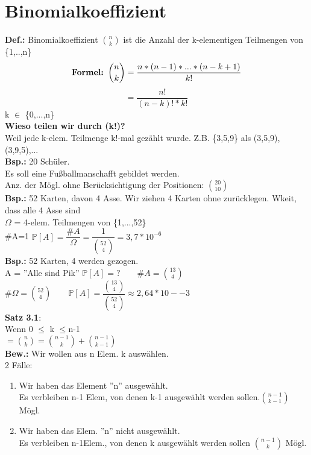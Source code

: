\section{Binomialkoeffizient}
\textbf{Def.:} Binomialkoeffizient $\binom{n}{k}$ ist die Anzahl der k-elementigen Teilmengen von \{1,..,n\}\medskip\\
 $$\text{\textbf{Formel: }}\binom{n}{k}= \frac{n*(n-1)*...*(n-k+1)}{k!}$$
 $$=\frac{n!}{(n-k)!*k!}$$ k $\in$ \{0,...,n\}\smallskip\\
\textbf{ Wieso teilen wir durch (k!)?}\\
 Weil jede k-elem. Teilmenge k!-mal gezählt wurde. Z.B. \{3,5,9\} als (3,5,9), (3,9,5),...\\
 \textbf{Bsp.:} 20 Schüler.\\Es soll eine Fußballmanschafft gebildet werden.\\
 Anz. der Mögl. ohne Berücksichtigung der Positionen: $\binom{20}{10}$\medskip\\
 \textbf{Bsp.:} 52 Karten, davon 4 Asse. Wir ziehen 4 Karten ohne zurücklegen. Wkeit, dass alle 4 Asse sind\\
 $\Omega$ = 4-elem. Teilmengen von \{1,...,52\}\\
 \#A=1 \hspace{1cm} $\mathds{P}[A]=\dfrac{\#A}{\Omega}=\dfrac{1}{\binom{52}{4}}=3,7*10^{-6}$\medskip\\
 \textbf{Bsp.:} 52 Karten, 4 werden gezogen.\\
 A = ''Alle sind Pik''
 $\mathds{P}[A]= ? \qquad \#A=\binom{13}{4} $\\
 \#$\Omega = \binom{52}{4} \qquad \mathds{P}[A] = \dfrac{\binom{13}{4}}{\binom{52}{4}} \approx 2,64*10-{-3} $\medskip\\
 \textbf{Satz 3.1}:\\ Wenn 0 $\leq$ k $\leq$n-1\\
 $=\binom{n}{k}=\binom{n-1}{k}+\binom{n-1}{k-1}$\smallskip\\
 \textbf{Bew.:} Wir wollen aus n Elem. k auswählen.\\
 2 Fälle:
 \begin{enumerate}
 	\item Wir haben das Element ''n'' ausgewählt. \\ Es verbleiben n-1 Elem, von denen k-1 ausgewählt werden sollen.$\binom{n-1}{k-1}$ Mögl.
 	\item Wir haben das Elem. ''n'' nicht ausgewählt.\\
 	Es verbleiben n-1Elem., von denen k ausgewählt werden sollen $\binom{n-1}{k}$ Mögl.
 \end{enumerate}
